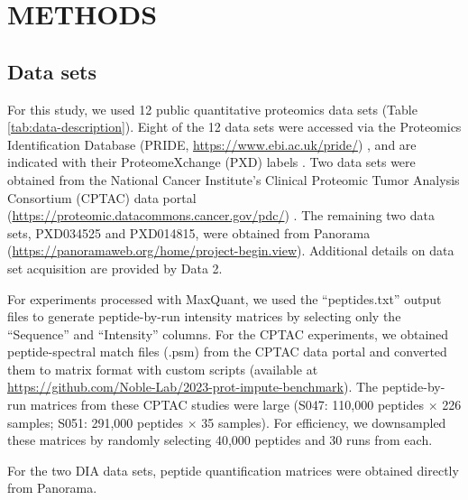 \documentclass{article}
\begin{document}
\section{METHODS}

\subsection{Data sets}

For this study, we used 12 public quantitative proteomics data sets (Table \ref{tab:data-description}). Eight of the 12 data sets were accessed via the Proteomics Identification Database (PRIDE, \url{https://www.ebi.ac.uk/pride/}) \cite{PRIDE}, and are indicated with their ProteomeXchange (PXD) labels \cite{ProteomeXchange}. Two data sets were obtained from the National Cancer Institute's Clinical Proteomic Tumor Analysis Consortium (CPTAC) data portal (\url{https://proteomic.datacommons.cancer.gov/pdc/}) \cite{CPTAC}.  The remaining two data sets, PXD034525 and PXD014815, were obtained from Panorama (\url{https://panoramaweb.org/home/project-begin.view}). Additional details on data set acquisition are provided by Data 2.

For experiments processed with MaxQuant, we used the ``peptides.txt'' output files to generate peptide-by-run intensity matrices by selecting only the ``Sequence'' and ``Intensity'' columns. For the CPTAC experiments, we obtained peptide-spectral match files (.psm) from the CPTAC data portal and converted them to matrix format with custom scripts (available at \url{https://github.com/Noble-Lab/2023-prot-impute-benchmark}). The peptide-by-run matrices from these CPTAC studies were large (S047: 110,000 peptides $\times$ 226 samples; S051: 291,000 peptides $\times$ 35 samples). For efficiency, we downsampled these matrices by randomly selecting 40,000 peptides and 30 runs from each. 

For the two DIA data sets, peptide quantification matrices were obtained directly from Panorama.
\end{document}
